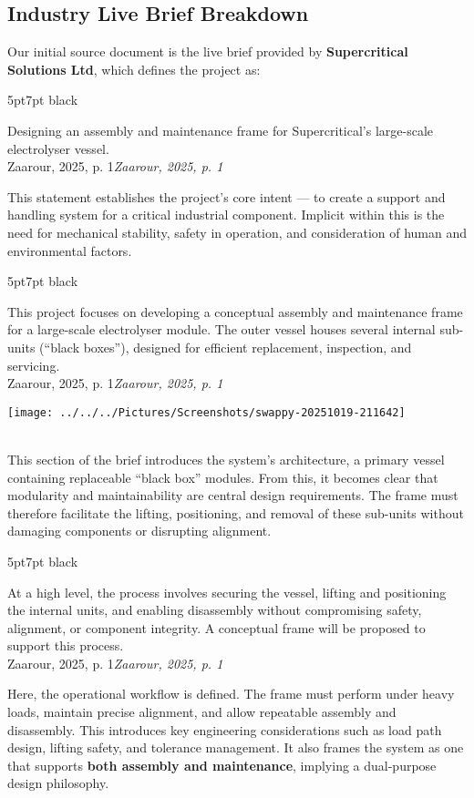 \documentclass{report}
\newcommand{\formalsource}{}
\newenvironment{formal}[3][]{	\renewcommand{\formalsource}{#1}
	\def\lefty{\color{#2}\textquotedblleft}
	\def\righty{\color{#2}\textquotedblright}
	\def\FrameCommand{%
		\hspace{1pt}%
		{\color{#2}\vrule width 2pt}%
		{\color{#3}\vrule width 4pt}%
		\colorbox{#3}%
	}%
	\MakeFramed{\advance\hsize-\width\FrameRestore}%
	\begin{adjustwidth}{5pt}{7pt}%
		\vspace{4pt}%
		\ifx#2\empty\else\smash{\raisebox{-0.5em}{\huge\lefty}}\hspace{0em}\fi%
	}{%
		\hspace{0em}\smash{\raisebox{-0.5em}{\huge\righty}}\\%
		\vspace{0pt}%
		\ifx\formalsource\empty\else\hfill{\footnotesize\textit{\formalsource}}\fi%
	\end{adjustwidth}%
	\endMakeFramed%
	\noindent%
}
\begin{document}
\subsection{Industry Live Brief Breakdown}
\begin{minipage}{0.58\textwidth}
Our initial source document is the live brief provided by \textbf{Supercritical Solutions Ltd}, which defines the project as:\begin{formal}[Zaarour, 2025, p. 1]{black}{white}
	Designing an assembly and maintenance frame for Supercritical’s large-scale electrolyser vessel.
\end{formal}
This statement establishes the project’s core intent — to create a support and handling system for a critical industrial component. Implicit within this is the need for mechanical stability, safety in operation, and consideration of human and environmental factors.
\begin{formal}[Zaarour, 2025, p. 1]{black}{white}
	This project focuses on developing a conceptual assembly and maintenance frame for a large-scale electrolyser module. The outer vessel houses several internal sub-units (“black boxes”), designed for efficient replacement, inspection, and servicing.
\end{formal}
\end{minipage}\hfill
\begin{minipage}{0.4\textwidth}
    \texttt{[image: ../../../Pictures/Screenshots/swappy-20251019-211642]}
\end{minipage}\\[1em]
This section of the brief introduces the system’s architecture, a primary vessel containing replaceable “black box” modules. From this, it becomes clear that modularity and maintainability are central design requirements. The frame must therefore facilitate the lifting, positioning, and removal of these sub-units without damaging components or disrupting alignment.
\begin{formal}[Zaarour, 2025, p. 1]{black}{white}
	At a high level, the process involves securing the vessel, lifting and positioning the internal units, and enabling disassembly without compromising safety, alignment, or component integrity. A conceptual frame will be proposed to support this process.
\end{formal}
Here, the operational workflow is defined. The frame must perform under heavy loads, maintain precise alignment, and allow repeatable assembly and disassembly. This introduces key engineering considerations such as load path design, lifting safety, and tolerance management. It also frames the system as one that supports \textbf{both assembly and maintenance}, implying a dual-purpose design philosophy.
\end{document}
